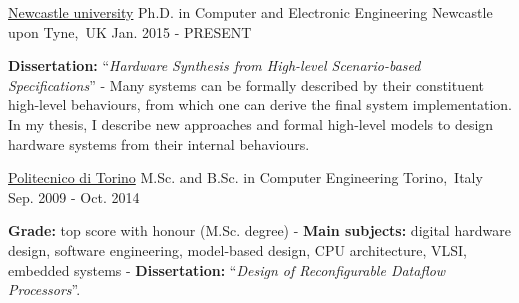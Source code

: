 
\begin{cventries}


\cventry
{\href{https://www.ncl.ac.uk/}{\color{myblue}Newcastle university}} %
{Ph.D. in Computer and Electronic Engineering} %
{Newcastle upon Tyne,~UK} %
{Jan. 2015 - PRESENT} %
{ %
\begin{cvitems}
\textbf{Dissertation:} ``\textit{Hardware Synthesis from High-level 
Scenario-based Specifications}'' - Many systems can be formally described 
by their constituent high-level behaviours, from which one can derive the final 
system implementation. In my thesis, I describe new approaches and formal 
high-level models to design hardware systems from their internal behaviours.
\end{cvitems}
}


\cventry
{\href{https://www.polito.it/?lang=en}{\color{myblue}Politecnico di Torino}}
{M.Sc. and B.Sc. in Computer Engineering}
{Torino,~Italy}
{Sep. 2009 - Oct. 2014}
{
\begin{cvitems}
\textbf{Grade:} top score with honour (M.Sc. degree) - \textbf{Main subjects:} 
digital hardware design, software engineering, model-based design, CPU 
architecture, VLSI, embedded systems - \textbf{Dissertation:} ``\emph{Design of 
Reconfigurable Dataflow Processors}''.
\end{cvitems}
}


\end{cventries}
\vspace{-1mm}